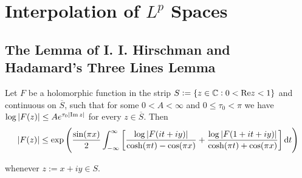 \section{Interpolation of $L^p$ Spaces}
\subsection{The Lemma of I. I. Hirschman and Hadamard's Three Lines Lemma}

\begin{lemma}[I. I. Hirschman]
	Let $F$ be a holomorphic function in the strip $S := \cbr[0]{z \in \mathbb{C}: 0 < \mathrm{Re}z < 1}$ and continuous on $\overline{S}$, such that for some $0 < A < \infty$ and $0 \leq \tau_0 < \pi$ we have $\log \abs[0]{ F( z )} \leq A e^{\tau_0 \abs[0]{ \Im z}}$ for every $z \in \overline{S}$. Then
	\begin{equation*}
		\abs[0]{ F(z) } \leq \exp\del{ \frac{\sin(\pi x)}{2} \int_{-\infty}^\infty \sbr{ \frac{\log \abs[0]{ F(it + iy)}}{\cosh(\pi t) - \cos(\pi x)} + \frac{\log \abs[0]{ F(1 + it + iy)}}{\cosh(\pi t) + \cos(\pi x)} } \d t}
	\end{equation*}

	\noindent whenever $z := x + iy \in S$.
	\label{lem:hirschman_lemma}
\end{lemma}

